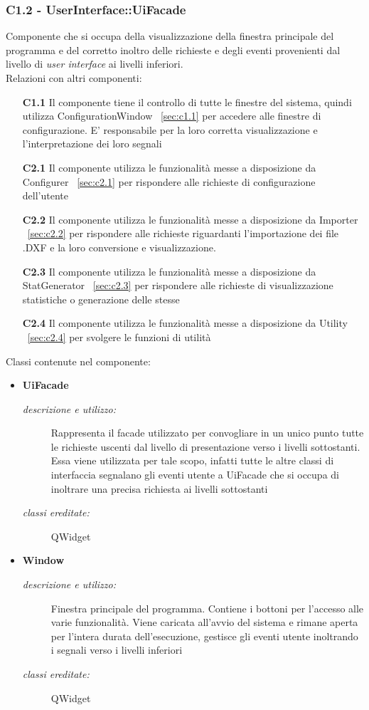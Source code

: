 \subsubsection{C1.2 - UserInterface::UiFacade} \label{sec:c1.2}
Componente che si occupa della visualizzazione della finestra principale del programma e del corretto inoltro delle richieste e degli eventi provenienti dal livello di \textit{user interface} ai livelli inferiori.\\
Relazioni con altri componenti: 
\begin{itemize} 
\item [\textbf{C1.1}]
Il componente tiene il controllo di tutte le finestre del sistema, quindi utilizza ConfigurationWindow ~\ref{sec:c1.1} per accedere alle finestre di configurazione. E' responsabile per la loro corretta visualizzazione e l'interpretazione dei loro segnali 
\item [\textbf{C2.1}]
Il componente utilizza le funzionalità messe a disposizione da Configurer ~\ref{sec:c2.1} per rispondere alle richieste di configurazione dell'utente 
\item [\textbf{C2.2}]
Il componente utilizza le funzionalità messe a disposizione da Importer ~\ref{sec:c2.2} per rispondere alle richieste riguardanti l'importazione dei file .DXF e la loro conversione e visualizzazione. 
\item [\textbf{C2.3}]
Il componente utilizza le funzionalità messe a disposizione da StatGenerator ~\ref{sec:c2.3} per rispondere alle richieste di visualizzazione statistiche o generazione delle stesse 
\item [\textbf{C2.4}]
Il componente utilizza le funzionalità messe a disposizione da Utility ~\ref{sec:c2.4} per svolgere le funzioni di utilità 
\end{itemize} 

Classi contenute nel componente: 
\begin{itemize} 
\item \textbf{UiFacade}
\begin{description}
\item [\textit{descrizione e utilizzo:}] Rappresenta il facade utilizzato per convogliare in un unico punto tutte le richieste uscenti dal livello di presentazione verso i livelli sottostanti. Essa viene utilizzata per tale scopo, infatti tutte le altre classi di interfaccia segnalano gli eventi utente a UiFacade che si occupa di inoltrare una precisa richiesta ai livelli sottostanti
\item [\textit{classi ereditate:}] QWidget
\end{description}
\item \textbf{Window}
\begin{description}
\item [\textit{descrizione e utilizzo:}] Finestra principale del programma. Contiene i bottoni per l'accesso alle varie funzionalità. Viene caricata all'avvio del sistema e rimane aperta per l'intera durata dell'esecuzione, gestisce gli eventi utente inoltrando i segnali verso i livelli inferiori
\item [\textit{classi ereditate:}] QWidget
\end{description}
\end{itemize}

